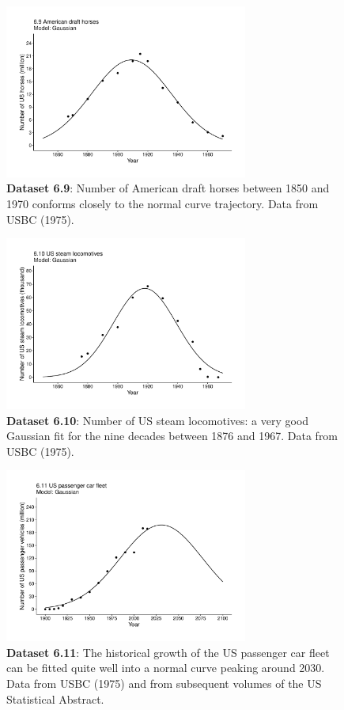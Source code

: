 \documentclass[aps,rmp,preprint,superscriptaddress,10pt,onecolumn]{article}
\begin{document}
\begin{figure}[h]
\includegraphics[width=8cm]{output/figs-ggplot/6.9.pdf}
\caption{\textbf{Dataset 6.9}: Number of American draft horses between 1850 and 1970 conforms closely to the normal curve trajectory. Data from USBC (1975). }
\end{figure}
	
\begin{figure}[h]
\includegraphics[width=8cm]{output/figs-ggplot/6.10.pdf}
\caption{\textbf{Dataset 6.10}: Number of US steam locomotives: a very good Gaussian fit for the nine decades between 1876 and 1967. Data from USBC (1975). }
\end{figure}
	
\begin{figure}[h]
\includegraphics[width=8cm]{output/figs-ggplot/6.11.pdf}
\caption{\textbf{Dataset 6.11}: The historical growth of the US passenger car fleet can be fitted quite well into a normal curve peaking around 2030. Data from USBC (1975) and from subsequent volumes of the US Statistical Abstract. }
\end{figure}
	
\end{document}
